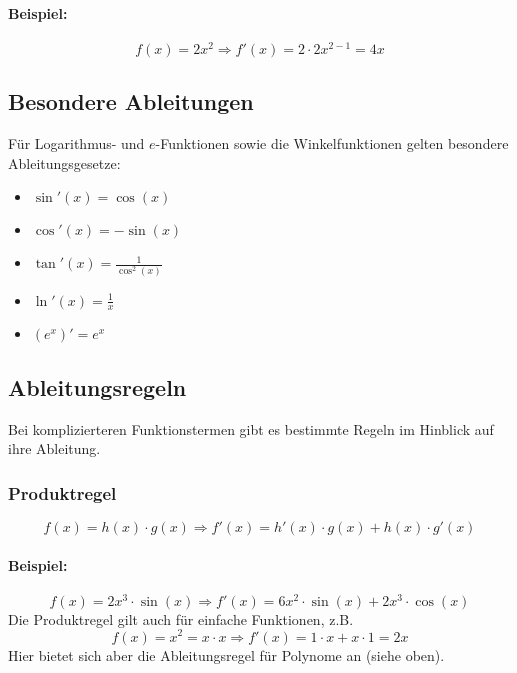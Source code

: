 \paragraph{Beispiel:}
\begin{equation*}
f(x)=2x^2 \Rightarrow f'(x)= 2 \cdot 2x^{2-1}=4x
\end{equation*}

\subsection{Besondere Ableitungen}
Für Logarithmus- und $e$-Funktionen sowie die Winkelfunktionen gelten besondere Ableitungsgesetze:
\begin{itemize}
\item $\sin'(x) = \cos(x)$
\item $\cos'(x) = - \sin(x)$
\item $\tan'(x) = \frac{1}{\cos^2(x)}$
\item $\ln'(x) = \frac{1}{x}$
\item $(e^x)' = e^x$
\end{itemize}

\subsection{Ableitungsregeln}
Bei komplizierteren Funktionstermen gibt es bestimmte Regeln im Hinblick auf ihre Ableitung.

\subsubsection{Produktregel}
\begin{equation*}
f(x) = h(x) \cdot g(x) \Rightarrow f'(x)=h'(x) \cdot g(x)+h(x) \cdot g'(x)
\end{equation*}

\paragraph{Beispiel:}
\begin{equation*}
f(x)=2x^3 \cdot \sin(x)\Rightarrow f'(x)=6x^2 \cdot \sin(x)+2x^3 \cdot \cos(x)
\end{equation*}
Die Produktregel gilt auch für einfache Funktionen, z.B.
\begin{equation*}
f(x)=x^2=x\cdot x\Rightarrow f'(x)=1 \cdot x+x \cdot 1 = 2x
\end{equation*}
Hier bietet sich aber die Ableitungsregel für Polynome an (siehe oben).

